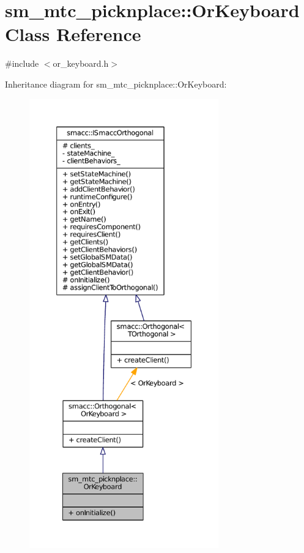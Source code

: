 \hypertarget{classsm__mtc__picknplace_1_1OrKeyboard}{}\section{sm\+\_\+mtc\+\_\+picknplace\+:\+:Or\+Keyboard Class Reference}
\label{classsm__mtc__picknplace_1_1OrKeyboard}


{\ttfamily \#include $<$or\+\_\+keyboard.\+h$>$}



Inheritance diagram for sm\+\_\+mtc\+\_\+picknplace\+:\+:Or\+Keyboard\+:
\nopagebreak
\begin{figure}[H]
\begin{center}
\leavevmode
\includegraphics[height=550pt]{classsm__mtc__picknplace_1_1OrKeyboard__inherit__graph}
\end{center}
\end{figure}


